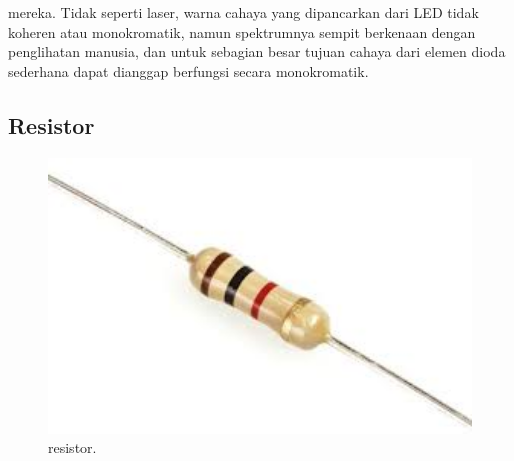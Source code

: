 mereka. Tidak seperti laser, warna cahaya yang dipancarkan dari LED tidak koheren atau monokromatik, namun spektrumnya sempit berkenaan dengan penglihatan manusia, dan untuk sebagian besar tujuan cahaya dari elemen dioda sederhana dapat dianggap berfungsi secara monokromatik.
\subsection{Resistor}

\begin{figure}[ht]
	\centerline{\includegraphics[width=1\textwidth]{figures/resistor.JPG}}
	\caption{resistor.}
	\label{resistor}
\end{figure}
	
